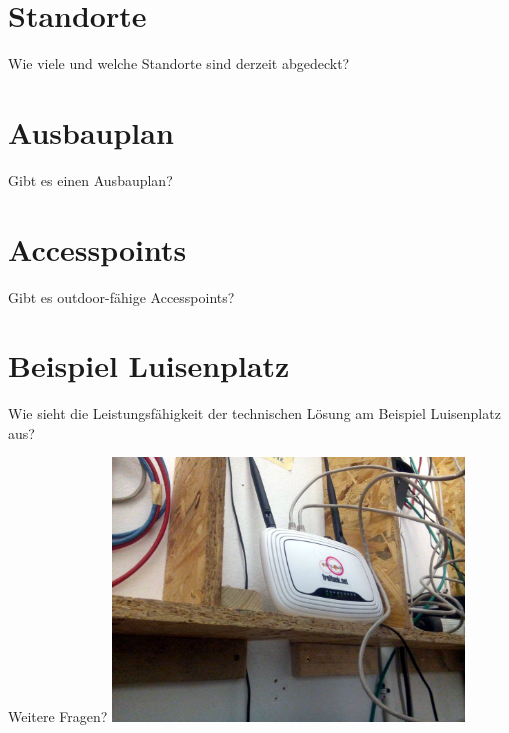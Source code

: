\documentclass{beamer}
\begin{document}
\section{Standorte}
\begin{frame}{Wie viele und welche Standorte sind derzeit abgedeckt?}
\end{frame}

\section{Ausbauplan}
\begin{frame}{Gibt es einen Ausbauplan?}
\end{frame}

\section{Accesspoints}
\begin{frame}{Gibt es outdoor-fähige Accesspoints?}
\end{frame}

\section{Beispiel Luisenplatz}
\begin{frame}{Wie sieht die Leistungsfähigkeit der technischen Lösung am Beispiel Luisenplatz aus?}
\end{frame}


\begin{frame}{Weitere Fragen?}
\vfill
\centering
\includegraphics[width=0.7\textwidth]{images/irl_router}
\vfill
\end{frame}
\end{document}
